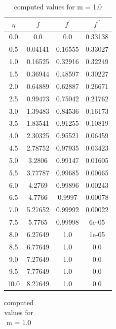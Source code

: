\begin{table}
    \parbox{0.45\linewidth}{
        \centering
        \caption{computed values for m = 0.3}
        \begin{tabular}{|c|c|c|c|}
            \hline
            $\eta$ & $f$ & $f^\prime$ & $f^{\prime\prime}$ \\ \hline
            0.0 & 0.0 & 0.0 & 0.33138 \\ \hline
            0.5 & 0.04141 & 0.16555 & 0.33027 \\ \hline
            1.0 & 0.16525 & 0.32916 & 0.32249 \\ \hline
            1.5 & 0.36944 & 0.48597 & 0.30227 \\ \hline
            2.0 & 0.64889 & 0.62887 & 0.26671 \\ \hline
            2.5 & 0.99473 & 0.75042 & 0.21762 \\ \hline
            3.0 & 1.39483 & 0.84536 & 0.16173 \\ \hline
            3.5 & 1.83541 & 0.91255 & 0.10819 \\ \hline
            4.0 & 2.30325 & 0.95521 & 0.06459 \\ \hline
            4.5 & 2.78752 & 0.97935 & 0.03423 \\ \hline
            5.0 & 3.2806 & 0.99147 & 0.01605 \\ \hline
            5.5 & 3.77787 & 0.99685 & 0.00665 \\ \hline
            6.0 & 4.2769 & 0.99896 & 0.00243 \\ \hline
            6.5 & 4.7766 & 0.9997 & 0.00078 \\ \hline
            7.0 & 5.27652 & 0.99992 & 0.00022 \\ \hline
            7.5 & 5.7765 & 0.99998 & 6e-05 \\ \hline
            8.0 & 6.27649 & 1.0 & 1e-05 \\ \hline
            8.5 & 6.77649 & 1.0 & 0.0 \\ \hline
            9.0 & 7.27649 & 1.0 & 0.0 \\ \hline
            9.5 & 7.77649 & 1.0 & 0.0 \\ \hline
            10.0 & 8.27649 & 1.0 & 0.0 \\ \hline
        \end{tabular}
        \label{table_m5}
    }
    \hfill
    \parbox{0.45\linewidth}{
        \centering
        \caption{computed values for m = 1.0}
        \begin{tabular}{|c|c|c|c|}
            \hline

\end{tabular}}
\end{table}
